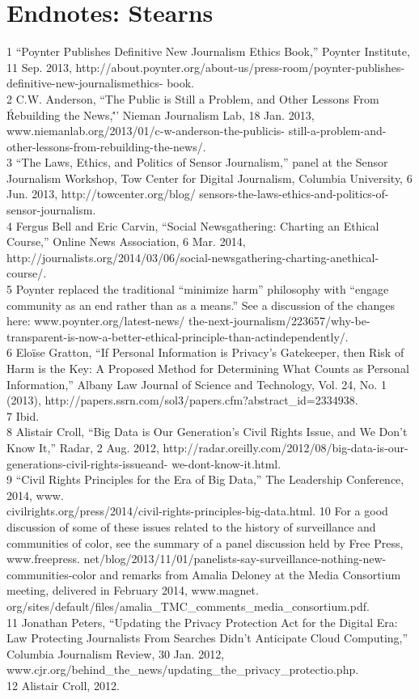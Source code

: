 \section{Endnotes: Stearns}
1 ``Poynter Publishes Definitive New Journalism Ethics Book,'' Poynter Institute, 11 Sep. 2013,
http://about.poynter.org/about-us/press-room/poynter-publishes-definitive-new-journalismethics-
book.\\
2 C.W. Anderson, ``The Public is Still a Problem, and Other Lessons From \'Rebuilding the News,\'''
Nieman Journalism Lab, 18 Jan. 2013, www.niemanlab.org/2013/01/c-w-anderson-the-publicis-
still-a-problem-and-other-lessons-from-rebuilding-the-news/.\\
3 ``The Laws, Ethics, and Politics of Sensor Journalism,'' panel at the Sensor Journalism Workshop,
Tow Center for Digital Journalism, Columbia University, 6 Jun. 2013, http://towcenter.org/blog/
sensors-the-laws-ethics-and-politics-of-sensor-journalism.\\
4 Fergus Bell and Eric Carvin, ``Social Newsgathering: Charting an Ethical Course,'' Online News
Association, 6 Mar. 2014, http://journalists.org/2014/03/06/social-newsgathering-charting-anethical-
course/.\\
5 Poynter replaced the traditional ``minimize harm'' philosophy with ``engage community as an end
rather than as a means.'' See a discussion of the changes here: www.poynter.org/latest-news/
the-next-journalism/223657/why-be-transparent-is-now-a-better-ethical-principle-than-actindependently/.\\
6 Eloïse Gratton, ``If Personal Information is Privacy's Gatekeeper, then Risk of Harm is the Key: A
Proposed Method for Determining What Counts as Personal Information,'' Albany Law Journal of
Science and Technology, Vol. 24, No. 1 (2013), http://papers.ssrn.com/sol3/papers.cfm?abstract_id=2334938.\\
7 Ibid.\\
8 Alistair Croll, ``Big Data is Our Generation's Civil Rights Issue, and We Don't Know It,'' Radar, 2 Aug. 2012, http://radar.oreilly.com/2012/08/big-data-is-our-generations-civil-rights-issueand-
we-dont-know-it.html.\\
9 ``Civil Rights Principles for the Era of Big Data,'' The Leadership Conference, 2014, www.\\
civilrights.org/press/2014/civil-rights-principles-big-data.html.
10 For a good discussion of some of these issues related to the history of surveillance and
communities of color, see the summary of a panel discussion held by Free Press, www.freepress.
net/blog/2013/11/01/panelists-say-surveillance-nothing-new-communities-color and remarks
from Amalia Deloney at the Media Consortium meeting, delivered in February 2014, www.magnet.
org/sites/default/files/amalia_TMC_comments_media_consortium.pdf.\\
11 Jonathan Peters, ``Updating the Privacy Protection Act for the Digital Era: Law Protecting
Journalists From Searches Didn't Anticipate Cloud Computing,'' Columbia Journalism Review, 30
Jan. 2012, www.cjr.org/behind_the_news/updating_the_privacy_protectio.php.\\
12 Alistair Croll, 2012.\\

